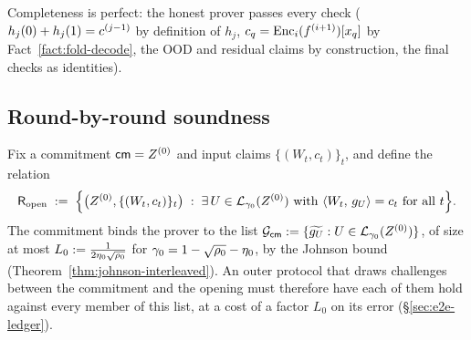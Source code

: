 Completeness is perfect: the honest prover passes every check ($h_j(0) + h_j(1) = c^{(j-1)}$ by definition of $h_j$, $c_q = \mathrm{Enc}_i(f^{(i+1)})[x_q]$ by Fact~\ref{fact:fold-decode}, the OOD and residual claims by construction, the final checks as identities).

\subsection{Round-by-round soundness}\label{sec:soundness}

Fix a commitment $\mathsf{cm} = Z^{(0)}$ and input claims $\{(W_t, c_t)\}_t$, and define the relation
\[
\mathsf{R}_{\mathrm{open}} \;:=\; \Bigl\{ \bigl(Z^{(0)}, \{(W_t, c_t)\}_t\bigr) \;:\; \exists\, U \in \mathcal{L}_{\gamma_0}(Z^{(0)}) \text{ with } \langle W_t,\, g_U \rangle = c_t \text{ for all } t \Bigr\}.
\]
The commitment binds the prover to the list $\mathcal{G}_{\mathsf{cm}} := \{\widetilde{g_U} : U \in \mathcal{L}_{\gamma_0}(Z^{(0)})\}$, of size at most $L_0 := \tfrac{1}{2\eta_0\sqrt{\rho_0}}$ for $\gamma_0 = 1 - \sqrt{\rho_0} - \eta_0$, by the Johnson bound (Theorem~\ref{thm:johnson-interleaved}). An outer protocol that draws challenges between the commitment and the opening must therefore have each of them hold against every member of this list, at a cost of a factor $L_0$ on its error (\S\ref{sec:e2e-ledger}).

